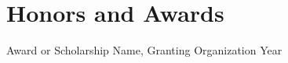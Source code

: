 \section{Honors and Awards}

\begin{onecolentry}
    Award or Scholarship Name, Granting Organization \hfill Year
\end{onecolentry}
\vspace{0.10cm}

